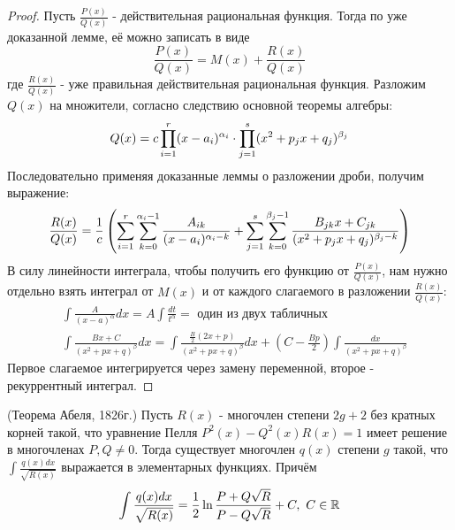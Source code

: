 \begin{proof}
	Пусть $\frac{P(x)}{Q(x)}$ - действительная рациональная функция. Тогда по уже доказанной лемме, её можно записать в виде
	\[
		\frac{P(x)}{Q(x)} = M(x) + \frac{R(x)}{Q(x)}
	\]
	где $\frac{R(x)}{Q(x)}$ - уже правильная действительная рациональная функция. Разложим $Q(x)$ на множители, согласно следствию основной теоремы алгебры:
	\[
		Q(x) = c \prod\limits_{i = 1}^r (x - a_i)^{\alpha_i} \cdot \prod\limits_{j = 1}^s (x^2 + p_j x + q_j)^{\beta_j}
	\]
	Последовательно применяя доказанные леммы о разложении дроби, получим выражение:
	\[
		\frac{R(x)}{Q(x)} = \frac{1}{c} \left(\sum\limits_{i = 1}^r \sum\limits_{k = 0}^{\alpha_i - 1} \frac{A_{ik}}{(x - a_i)^{\alpha_i - k}} + \sum\limits_{j = 1}^s \sum\limits_{k = 0}^{\beta_j - 1} \frac{B_{jk} x + C_{jk}}{(x^2 + p_j x + q_j)^{\beta_j - k}}\right)
	\]
	В силу линейности интеграла, чтобы получить его функцию от $\frac{P(x)}{Q(x)}$, нам нужно отдельно взять интеграл от $M(x)$ и от каждого слагаемого в разложении $\frac{R(x)}{Q(x)}$:
	\begin{align*}
		&{\int \frac{A}{(x - a)^\alpha} dx = A\int \frac{dt}{t^\alpha} = \text{ один из двух табличных}}
		\\
		&{\int \frac{Bx + C}{(x^2 + px + q)^\beta} dx = \int \frac{\frac{B}{2}(2x + p)}{(x^2 + px + q)^\beta} dx + \left(C - \frac{Bp}{2}\right) \int \frac{dx}{(x^2 + px + q)^\beta}}
	\end{align*}
	Первое слагаемое интегрируется через замену переменной, второе - рекуррентный интеграл. 
\end{proof}

\begin{theorem} (Теорема Абеля, 1826г.)
	Пусть $R(x)$ - многочлен степени $2g + 2$ без кратных корней такой, что уравнение Пелля $P^2(x) - Q^2(x)R(x) = 1$ имеет решение в многочленах $P, Q \neq 0$. Тогда существует многочлен $q(x)$ степени $g$ такой, что $\int \frac{q(x)dx}{\sqrt{R(x)}}$ выражается в элементарных функциях. Причём
	\[
		\int \frac{q(x)dx}{\sqrt{R(x)}} = \frac{1}{2}\ln \frac{P + Q\sqrt{R}}{P - Q\sqrt{R}} + C,\ C \in \mathbb{R}
	\]
\end{theorem}

